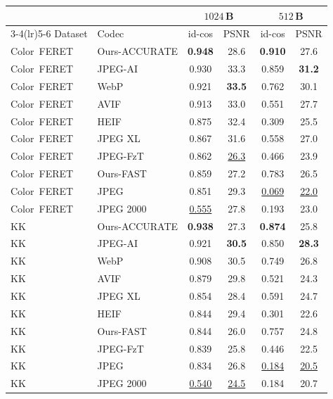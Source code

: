 \begin{tabular}{llcccc}
\toprule
& & \multicolumn{2}{c}{$1024$\,B} & \multicolumn{2}{c}{$512$\,B} \\
\cmidrule(lr){3-4}\cmidrule(lr){5-6}
Dataset & Codec & id-cos & PSNR & id-cos & PSNR \\
\midrule
Color~FERET & Ours-ACCURATE & \cellcolor{green!25}\textbf{0.948} & 28.6 & \cellcolor{green!25}\textbf{0.910} & 27.6 \\
Color~FERET & JPEG-AI & 0.930 & 33.3 & 0.859 & \cellcolor{green!25}\textbf{31.2} \\
Color~FERET & WebP & 0.921 & \cellcolor{green!25}\textbf{33.5} & 0.762 & 30.1 \\
Color~FERET & AVIF & 0.913 & 33.0 & 0.551 & 27.7 \\
Color~FERET & HEIF & 0.875 & 32.4 & 0.309 & 25.5 \\
Color~FERET & JPEG XL & 0.867 & 31.6 & 0.558 & 27.0 \\
Color~FERET & JPEG-FzT & 0.862 & \cellcolor{red!22}\underline{26.3} & 0.466 & 23.9 \\
Color~FERET & Ours-FAST & 0.859 & 27.2 & 0.783 & 26.5 \\
Color~FERET & JPEG & 0.851 & 29.3 & \cellcolor{red!22}\underline{0.069} & \cellcolor{red!22}\underline{22.0} \\
Color~FERET & JPEG 2000 & \cellcolor{red!22}\underline{0.555} & 27.8 & 0.193 & 23.0 \\
\midrule
KK & Ours-ACCURATE & \cellcolor{green!25}\textbf{0.938} & 27.3 & \cellcolor{green!25}\textbf{0.874} & 25.8 \\
KK & JPEG-AI & 0.921 & \cellcolor{green!25}\textbf{30.5} & 0.850 & \cellcolor{green!25}\textbf{28.3} \\
KK & WebP & 0.908 & 30.5 & 0.749 & 26.8 \\
KK & AVIF & 0.879 & 29.8 & 0.521 & 24.3 \\
KK & JPEG XL & 0.854 & 28.4 & 0.591 & 24.7 \\
KK & HEIF & 0.844 & 29.4 & 0.301 & 22.6 \\
KK & Ours-FAST & 0.844 & 26.0 & 0.757 & 24.8 \\
KK & JPEG-FzT & 0.839 & 25.8 & 0.446 & 22.5 \\
KK & JPEG & 0.834 & 26.8 & \cellcolor{red!22}\underline{0.184} & \cellcolor{red!22}\underline{20.5} \\
KK & JPEG 2000 & \cellcolor{red!22}\underline{0.540} & \cellcolor{red!22}\underline{24.5} & 0.184 & 20.7 \\
\bottomrule
\end{tabular}
